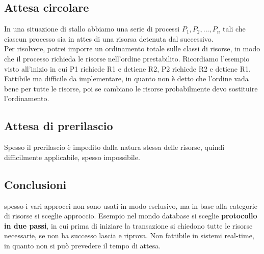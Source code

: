 \documentclass{article}
\begin{document}
\subsection{Attesa circolare}
In una situazione di stallo abbiamo una serie di processi $P_1, P_2, ..., P_n$ tali che ciascun processo sia in attes di una risorsa detenuta
dal successivo.\\
Per risolvere, potrei imporre un ordinamento totale sulle classi di risorse, in modo che il processo richieda le risorse nell'ordine prestabilito.
Ricordiamo l'esempio visto all'inizio in cui P1 richiede R1 e detiene R2, P2 richiede R2 e detiene R1.\\
Fattibile ma difficile da implementare, in quanto non è detto che l'ordine vada bene per tutte le risorse, poi se cambiano le risorse 
probabilmente devo sostituire l'ordinamento.\\

\subsection{Attesa di prerilascio}
Spesso il prerilascio è impedito dalla natura stessa delle risorse, quindi difficilmente applicabile, spesso impossibile.\\

\subsection{Conclusioni}
spesso i vari approcci non sono usati in modo esclusivo, ma in base alla categorie di risorse si sceglie approccio. Esempio nel mondo 
database si sceglie \textbf{protocollo in due passi}, in cui prima di iniziare la transazione si chiedono tutte le risorse necessarie, se non ha successo 
lascia e riprova. Non fattibile in sistemi real-time, in quanto non si può prevedere il tempo di attesa.\\
\newpage
\end{document}
